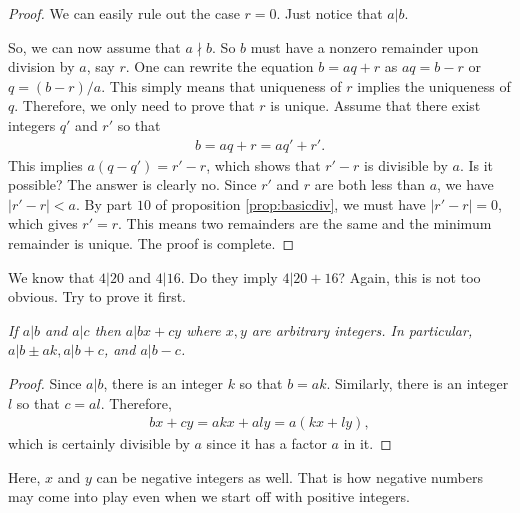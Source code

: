 \documentclass{subfile}
\begin{document}
	\begin{proof}
		We can easily rule out the case $r=0$. Just notice that $a|b$.

		So, we can now assume that $a\nmid b$. So $b$ must have a nonzero remainder upon division by $a$, say $r$. One can rewrite the equation $b=aq+r$ as $aq=b-r$ or $q=(b-r)/a$. This simply means that uniqueness of $r$ implies the uniqueness of $q$. Therefore, we only need to prove that $r$ is unique. Assume that there exist integers $q'$ and $r'$ so that
		\begin{align*}
			b=aq+r=aq'+r'.
		\end{align*}
		This implies $a(q-q')=r'-r$, which shows that $r'-r$ is divisible by $a$. Is it possible? The answer is clearly no. Since $r'$ and $r$ are both less than $a$, we have $|r'-r|<a$. By part $10$ of proposition \eqref{prop:basicdiv}, we must have $|r'-r|=0$, which gives $r'=r$. This means two remainders are the same and the minimum remainder is unique. The proof is complete.
	\end{proof}


	\begin{question}
		We know that $4|20$ and $4|16$. Do they imply $4|20+16$? Again, this is not too obvious. Try to prove it first.
	\end{question}

	\begin{proposition}\slshape\label{prop:a|bx+cy}
		If $a|b$ and $a|c$ then $a|bx+cy$ where $x,y$ are arbitrary integers. In particular, $a|b\pm ak,a|b+c$, and $a|b-c$.
	\end{proposition}

	\begin{proof}
		Since $a|b$, there is an integer $k$ so that $b=ak$. Similarly, there is an integer $l$ so that $c=al$. Therefore,
		\begin{align*}
			bx+cy=akx+aly=a(kx+ly),
		\end{align*}
		which is certainly divisible by $a$ since it has a factor $a$ in it.
	\end{proof}

	\begin{note}
		Here, $x$ and $y$ can be negative integers as well. That is how negative numbers may come into play even when we start off with positive integers.
	\end{note}
\end{document}
